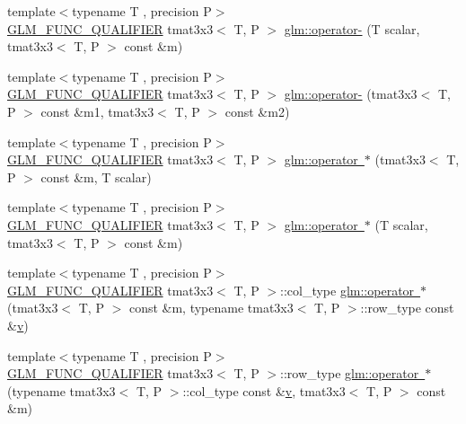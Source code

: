 \begin{DoxyCompactItemize}
\item 
{\footnotesize template$<$typename T , precision P$>$ }\\\mbox{\hyperlink{setup_8hpp_a33fdea6f91c5f834105f7415e2a64407}{G\+L\+M\+\_\+\+F\+U\+N\+C\+\_\+\+Q\+U\+A\+L\+I\+F\+I\+ER}} tmat3x3$<$ T, P $>$ \mbox{\hyperlink{namespaceglm_aace121adce666d4a686f068de1833f3a}{glm\+::operator-\/}} (T scalar, tmat3x3$<$ T, P $>$ const \&m)
\item 
{\footnotesize template$<$typename T , precision P$>$ }\\\mbox{\hyperlink{setup_8hpp_a33fdea6f91c5f834105f7415e2a64407}{G\+L\+M\+\_\+\+F\+U\+N\+C\+\_\+\+Q\+U\+A\+L\+I\+F\+I\+ER}} tmat3x3$<$ T, P $>$ \mbox{\hyperlink{namespaceglm_aca1e701a0f64422be768b08ce5891ae0}{glm\+::operator-\/}} (tmat3x3$<$ T, P $>$ const \&m1, tmat3x3$<$ T, P $>$ const \&m2)
\item 
{\footnotesize template$<$typename T , precision P$>$ }\\\mbox{\hyperlink{setup_8hpp_a33fdea6f91c5f834105f7415e2a64407}{G\+L\+M\+\_\+\+F\+U\+N\+C\+\_\+\+Q\+U\+A\+L\+I\+F\+I\+ER}} tmat3x3$<$ T, P $>$ \mbox{\hyperlink{namespaceglm_ad68fd01775d082b2b46653fec23b4c51}{glm\+::operator $\ast$}} (tmat3x3$<$ T, P $>$ const \&m, T scalar)
\item 
{\footnotesize template$<$typename T , precision P$>$ }\\\mbox{\hyperlink{setup_8hpp_a33fdea6f91c5f834105f7415e2a64407}{G\+L\+M\+\_\+\+F\+U\+N\+C\+\_\+\+Q\+U\+A\+L\+I\+F\+I\+ER}} tmat3x3$<$ T, P $>$ \mbox{\hyperlink{namespaceglm_a1b37efd6ede748569ada8f03c0dbec1f}{glm\+::operator $\ast$}} (T scalar, tmat3x3$<$ T, P $>$ const \&m)
\item 
{\footnotesize template$<$typename T , precision P$>$ }\\\mbox{\hyperlink{setup_8hpp_a33fdea6f91c5f834105f7415e2a64407}{G\+L\+M\+\_\+\+F\+U\+N\+C\+\_\+\+Q\+U\+A\+L\+I\+F\+I\+ER}} tmat3x3$<$ T, P $>$\+::col\+\_\+type \mbox{\hyperlink{namespaceglm_a3d692f72609320807bc4031cb87ed980}{glm\+::operator $\ast$}} (tmat3x3$<$ T, P $>$ const \&m, typename tmat3x3$<$ T, P $>$\+::row\+\_\+type const \&\mbox{\hyperlink{glad_8h_a14cfbe2fc2234f5504618905b69d1e06}{v}})
\item 
{\footnotesize template$<$typename T , precision P$>$ }\\\mbox{\hyperlink{setup_8hpp_a33fdea6f91c5f834105f7415e2a64407}{G\+L\+M\+\_\+\+F\+U\+N\+C\+\_\+\+Q\+U\+A\+L\+I\+F\+I\+ER}} tmat3x3$<$ T, P $>$\+::row\+\_\+type \mbox{\hyperlink{namespaceglm_a86abd362a3cb471f22371c69a2adfd4b}{glm\+::operator $\ast$}} (typename tmat3x3$<$ T, P $>$\+::col\+\_\+type const \&\mbox{\hyperlink{glad_8h_a14cfbe2fc2234f5504618905b69d1e06}{v}}, tmat3x3$<$ T, P $>$ const \&m)

\end{DoxyCompactItemize}
